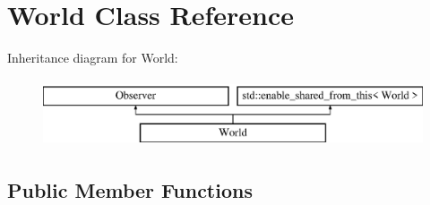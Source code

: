 \hypertarget{class_world}{}\section{World Class Reference}
\label{class_world}
Inheritance diagram for World\+:\begin{figure}[H]
\begin{center}
\leavevmode
\includegraphics[height=2.000000cm]{class_world}
\end{center}
\end{figure}
\subsection*{Public Member Functions}
